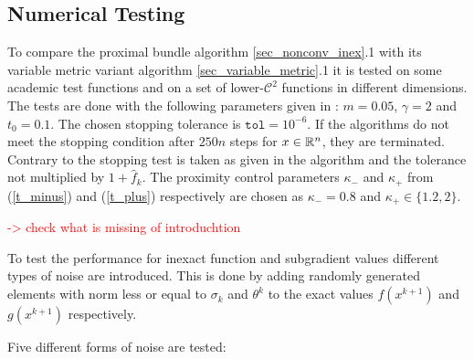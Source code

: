 %

\subsection{Numerical Testing}

To compare the proximal bundle algorithm \ref{sec_nonconv_inex}.1 with its variable metric variant algorithm  \ref{sec_variable_metric}.1 it is tested on some academic test functions and on a set of lower-\(\mathcal{C}^2\) functions in different dimensions.
The tests are done with the following parameters given in \cite{Hare2016}: \(m = 0.05\), \(\gamma = 2\) and \(t_0 = 0.1\). The chosen stopping tolerance is \(\mathtt{tol} = 10^{-6}\). If the algorithms do not meet the stopping condition after \(250n\) steps for \(x \in \mathbb{R}^n\), they are terminated. Contrary to \cite{Hare2016} the stopping test is taken as given in the algorithm and the tolerance not multiplied by \(1+\hat{f}_k\).
The proximity control parameters \(\kappa_-\) and \(\kappa_+\) from (\ref{t_minus}) and (\ref{t_plus}) respectively are chosen as \(\kappa_-= 0.8\) and \(\kappa_+\in\{1.2,2\}\).  

\textcolor{red}{-> check what is missing of introduchtion}

To test the performance for inexact function and subgradient values different types of noise are introduced. This is done by adding randomly generated elements with norm less or equal to \(\sigma_k\) and \(\theta^k\) to the exact values \(f(x^{k+1})\) and \(g(x^{k+1})\) respectively.

Five different forms of noise are tested:


